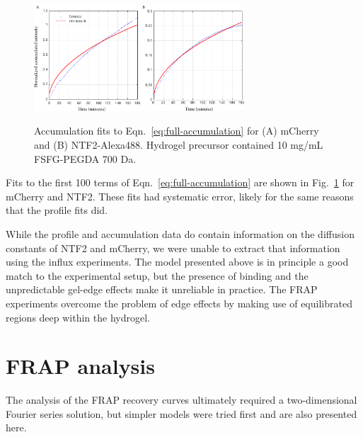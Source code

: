 \begin{figure}
\caption[Fits to accumulation curves.]{Accumulation fits to Eqn.~\ref{eq:full-accumulation} for (A) mCherry and (B) NTF2-Alexa488.  Hydrogel precursor contained 10 mg/mL FSFG-PEGDA 700 Da.}
\centering
\includegraphics[width=0.7\textwidth]{figs/ch04/accumulation.pdf}
\label{fig:acc}
\end{figure} 


Fits to the first 100 terms of Eqn.~\ref{eq:full-accumulation} are shown in Fig.~\ref{fig:acc} for mCherry and NTF2.  These fits had systematic error, likely for the same reasons that the profile fits did.

While the profile and accumulation data do contain information on the diffusion constants of NTF2 and mCherry, we were unable to extract that information using the influx experiments.  The model presented above is in principle a good match to the experimental setup, but the presence of binding and the unpredictable gel-edge effects make it unreliable in practice.  The FRAP experiments overcome the problem of edge effects by making use of equilibrated regions deep within the hydrogel.

\section{FRAP analysis}
The analysis of the FRAP recovery curves ultimately required a two-dimensional Fourier series solution, but simpler models were tried first and are also presented here.

\label{sec:FRAP-analysis}


